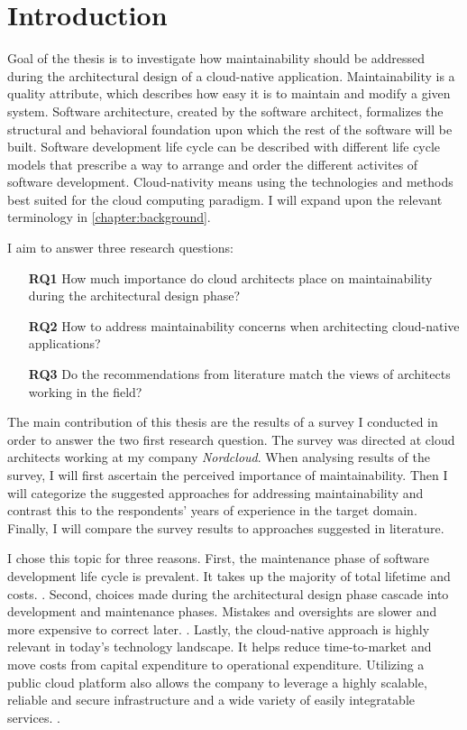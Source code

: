 \documentclass[utf8,english]{gradu3}
\begin{document}
\chapter{Introduction}

Goal of the thesis is to investigate how maintainability should be addressed during the
architectural design of a cloud-native application.
Maintainability is a quality attribute, which describes how easy it is to
maintain and modify a given system.
Software architecture, created by the software architect, formalizes the
structural and behavioral foundation upon which the rest of the software will be built.
Software development life cycle can be described with different life cycle models that
prescribe a way to arrange and order the different activites of software development.
Cloud-nativity means using the technologies and methods best suited for the cloud
computing paradigm. I will expand upon the relevant terminology in
\autoref{chapter:background}.

I aim to answer three research questions:
\begin{itemize}
  \item [\textbf{RQ1}] How much importance do cloud architects place on maintainability during
        the architectural design phase?
  \item [\textbf{RQ2}] How to address maintainability concerns when architecting cloud-native
        applications?
  \item [\textbf{RQ3}] Do the recommendations from literature match the views of architects
        working in the field?
\end{itemize}

The main contribution of this thesis are the results of a survey I conducted in order
to answer the two first research question. The survey was directed at cloud architects
working at my company \textit{Nordcloud}.
When analysing results of the survey, I will first ascertain the perceived
importance of maintainability. Then I will categorize the suggested approaches
for addressing maintainability and contrast this to the respondents' years of
experience in the target domain. Finally, I will compare the survey results to
approaches suggested in literature.

I chose this topic for three reasons. First, the maintenance phase of software
development life cycle is prevalent. It takes up the majority of total lifetime
and costs.  \parencite{Bass1998}. Second, choices made during the architectural
design phase cascade into development and maintenance phases. Mistakes and
oversights are slower and more expensive to correct later.
\parencites{Bass1998}{Mumtaz2021}. Lastly, the cloud-native approach is highly
relevant in today's technology landscape. It helps reduce time-to-market and move
costs from capital expenditure to operational expenditure. Utilizing a public
cloud platform also allows the company to leverage a highly scalable, reliable and
secure infrastructure and a wide variety of easily integratable services.
\parencite{Microsoft2022}.
\end{document}
